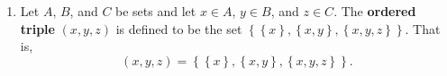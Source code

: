 \begin{enumerate}
\begin{enumerate}
\item Let $A$, $B$, and $C$ be sets and let $x \in A$, $y \in B$, and $z \in C$.  The \textbf{ordered triple} $(x, y, z)$ is defined to be the set $\left\{ \left\{ x \right\}, \left\{ x, y \right\}, \left\{ x, y, z \right\} \right\}$.  That is,
\[
\left( x, y, z \right) = 
\left\{ \left\{ x \right\}, \left\{ x, y \right\}, \left\{ x, y, z \right\} \right\}.
\]




\end{enumerate}


\end{enumerate}
\hbreak
\endinput
